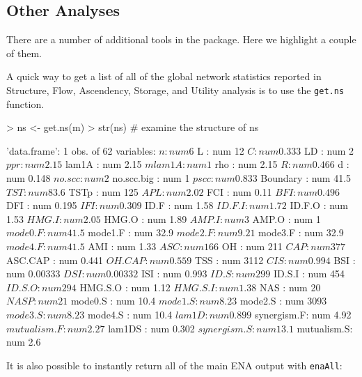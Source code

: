 \documentclass[11pt]{article}
\begin{document}
\subsection{Other Analyses}
There are a number of additional tools in the package.  Here we
highlight a couple of them.  

A quick way to get a list of all of the global network statistics reported in
Structure, Flow, Ascendency, Storage, and Utility analysis is to use the
\texttt{get.ns} function. 

\begin{Schunk}
\begin{Sinput}
> ns <- get.ns(m)
> str(ns)    # examine the structure of ns
\end{Sinput}
\begin{Soutput}
'data.frame':	1 obs. of  62 variables:
 $ n          : num 6
 $ L          : num 12
 $ C          : num 0.333
 $ LD         : num 2
 $ ppr        : num 2.15
 $ lam1A      : num 2.15
 $ mlam1A     : num 1
 $ rho        : num 2.15
 $ R          : num 0.466
 $ d          : num 0.148
 $ no.scc     : num 2
 $ no.scc.big : num 1
 $ pscc       : num 0.833
 $ Boundary   : num 41.5
 $ TST        : num 83.6
 $ TSTp       : num 125
 $ APL        : num 2.02
 $ FCI        : num 0.11
 $ BFI        : num 0.496
 $ DFI        : num 0.195
 $ IFI        : num 0.309
 $ ID.F       : num 1.58
 $ ID.F.I     : num 1.72
 $ ID.F.O     : num 1.53
 $ HMG.I      : num 2.05
 $ HMG.O      : num 1.89
 $ AMP.I      : num 3
 $ AMP.O      : num 1
 $ mode0.F    : num 41.5
 $ mode1.F    : num 32.9
 $ mode2.F    : num 9.21
 $ mode3.F    : num 32.9
 $ mode4.F    : num 41.5
 $ AMI        : num 1.33
 $ ASC        : num 166
 $ OH         : num 211
 $ CAP        : num 377
 $ ASC.CAP    : num 0.441
 $ OH.CAP     : num 0.559
 $ TSS        : num 3112
 $ CIS        : num 0.994
 $ BSI        : num 0.00333
 $ DSI        : num 0.00332
 $ ISI        : num 0.993
 $ ID.S       : num 299
 $ ID.S.I     : num 454
 $ ID.S.O     : num 294
 $ HMG.S.O    : num 1.12
 $ HMG.S.I    : num 1.38
 $ NAS        : num 20
 $ NASP       : num 21
 $ mode0.S    : num 10.4
 $ mode1.S    : num 8.23
 $ mode2.S    : num 3093
 $ mode3.S    : num 8.23
 $ mode4.S    : num 10.4
 $ lam1D      : num 0.899
 $ synergism.F: num 4.92
 $ mutualism.F: num 2.27
 $ lam1DS     : num 0.302
 $ synergism.S: num 13.1
 $ mutualism.S: num 2.6
\end{Soutput}
\end{Schunk}

It is also possible to instantly return all of the main ENA output
with \texttt{enaAll}:
\end{document}
